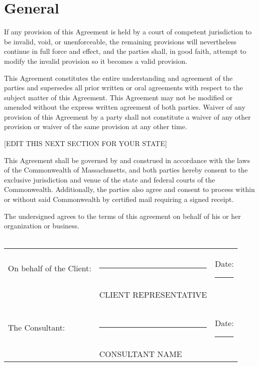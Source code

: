 \documentclass[12pt]{book}  %
\begin{document}
    
 \section{General}

If any provision of this Agreement is held by a court of competent
jurisdiction to be invalid, void, or unenforceable, the remaining provisions
will nevertheless continue in full force and effect, and the parties shall,
in good faith, attempt to modify the invalid provision so it becomes a valid
provision.

This Agreement constitutes the entire understanding and agreement of the
parties and supersedes all prior written or oral agreements with respect to
the subject matter of this Agreement. This Agreement may not be modified or
amended without the express written agreement of both parties. Waiver of any
provision of this Agreement by a party shall not constitute a waiver of any
other provision or waiver of the same provision at any other time.

[EDIT THIS NEXT SECTION FOR YOUR STATE]

This Agreement shall be governed by and construed in accordance with the
laws of the Commonwealth of Massachusetts, and both parties hereby consent
to the exclusive jurisdiction and venue of the state and federal courts of
the Commonwealth. Additionally, the parties also agree and consent to
process within or without said Commonwealth by certified mail requiring a
signed receipt.

\vspace{1cm} 

\noindent The undersigned agrees to the terms of this agreement on behalf of his or
her organization or business.\\\\

\noindent \begin{tabular}{l l l}
On behalf of the Client: & \rule{6cm}{.2pt} & Date: \rule{2.4cm}{.2pt}\\
                         & CLIENT REPRESENTATIVE      & \\\\\\
The Consultant:          & \rule{6cm}{.2pt} & Date: \rule{2.4cm}{.2pt}\\
                         & CONSULTANT NAME      & \\
\end{tabular}
\end{document}
